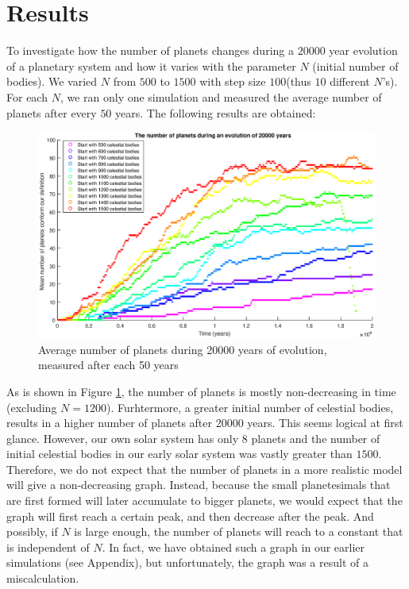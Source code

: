 \section{Results}\label{sec:results}
To investigate how the number of planets changes during a $20000$ year evolution of a planetary system and how it varies with the parameter $N$ (initial number of bodies). 
We varied $N$ from $500$ to $1500$ with step size $100$(thus $10$ different $N$'s). 
For each $N$, we ran only one simulation and measured the average number of planets after every $50$ years. The following results are obtained:

\begin{figure}[H]
\centering
\includegraphics[width=\textwidth]{AantPlanetenNieuw.eps}
\caption{Average number of planets during 20000 years of evolution, measured after each 50 years}
    \label{fig:AantPlanetenNieuw}
\end{figure}
As is shown in Figure \ref{fig:AantPlanetenNieuw}, the number of planets is mostly non-decreasing in time (excluding \(N=1200\)). 
Furhtermore, a greater initial number of celestial bodies, results in a higher number of planets after 20000 years. This seems logical at first glance. However, our own solar system has only 8 planets and the number of initial celestial bodies in our early solar system was vastly greater than  $1500$. Therefore, we do not expect that the number of planets in a more realistic model will give a non-decreasing graph.
Instead, because the small planetesimals that are first formed will later accumulate to bigger planets, we would expect that the graph will first reach a certain peak, and then decrease after the peak.
And possibly, if $N$ is large enough, the number of planets will reach to a constant that is independent of $N$. In fact, we have obtained such a graph in our earlier simulations (see Appendix), but unfortunately, the graph was a result of a miscalculation.\\

